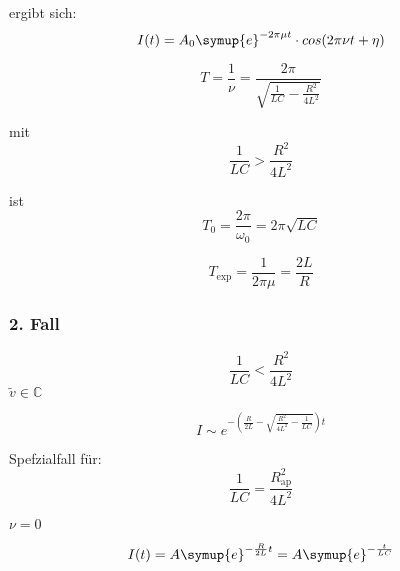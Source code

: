         ergibt sich:
        \begin{equation}
            I(t) = A_0 \symup{e}^{- 2 \pi \mu t} \cdot cos(2\pi \nu t + \eta) \nonumber
        \end{equation}

        \begin{equation}
            T = \frac{1}{\nu} = \frac{2 \pi}{\sqrt{\frac{1}{LC}-\frac{R^2}{4L^2}}} \nonumber
        \end{equation}

        mit 
        \begin{equation}
            \frac{1}{LC} > \frac{R^2}{4L^2} \nonumber
        \end{equation}

        ist
        \begin{equation}
            T_0 = \frac{2\pi}{\omega_0} = 2\pi \sqrt{LC} \nonumber
        \end{equation}

        \begin{equation}
            T_{\text{exp}} = \frac{1}{2 \pi \mu } = \frac{2L}{R} \nonumber
        \end{equation}

        \subsubsection{2. Fall}

        \begin{equation}
            \frac{1}{LC} < \frac{R^2}{4L^2} \nonumber
        \end{equation}
        $\tilde{v} \in \mathds{C}$

        \begin{equation}
            I \sim e^{- \left( \frac{R}{2L} - \sqrt{\frac{R^2}{4L^2} - \frac{1}{LC}}\right) t} \nonumber
        \end{equation}

        Spefzialfall für:
        \begin{equation}
            \frac{1}{LC} = \frac{R^2_{\text{ap}}}{4L^2} \nonumber
        \end{equation}

        $\nu = 0$

        \begin{equation}
            I(t) = A \symup{e}^{-\frac{R}{2L}t} = A \symup{e}^{-\frac{t}{LC}} \nonumber
        \end{equation}

